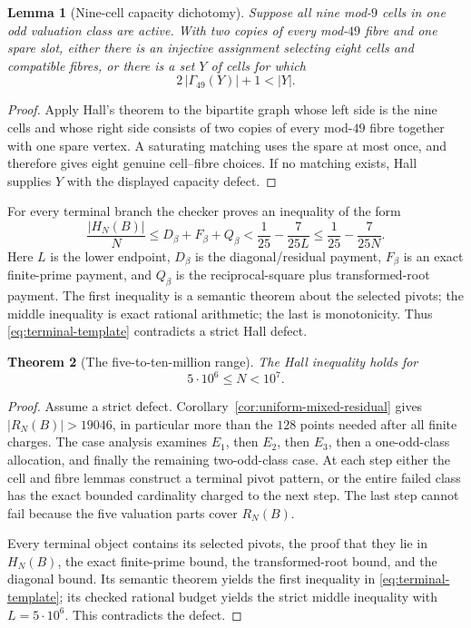 \documentclass[11pt]{article}
\newtheorem{theorem}{Theorem}[section]
\newtheorem{lemma}[theorem]{Lemma}
\theoremstyle{definition}
\newcommand{\RN}{R_N}
\newcommand{\FiveMillion}{5\cdot10^6}
\newcommand{\TenMillion}{10^7}
\begin{document}
\begin{lemma}[Nine-cell capacity dichotomy]\label{lem:nine-cell-capacity}
Suppose all nine mod-$9$ cells in one odd valuation class are active.
With two copies of every mod-$49$ fibre and one spare slot, either there is
an injective assignment selecting eight cells and compatible fibres, or
there is a set $Y$ of cells for which
\[
  2\,|\Gamma_{49}(Y)|+1<|Y|.
\]
\end{lemma}

\begin{proof}
Apply Hall's theorem to the bipartite graph whose left side is the nine cells
and whose right side consists of two copies of every mod-$49$ fibre together
with one spare vertex.  A saturating matching uses the spare at most once,
and therefore gives eight genuine cell--fibre choices.  If no matching
exists, Hall supplies $Y$ with the displayed capacity defect.
\end{proof}

For every terminal branch the checker proves an inequality of the form
\begin{equation}\label{eq:terminal-template}
 \frac{|H_N(B)|}{N}
 \leq D_\beta+F_\beta+Q_\beta
 <\frac1{25}-\frac7{25L}
 \leq\frac1{25}-\frac7{25N}.
\end{equation}
Here $L$ is the lower endpoint, $D_\beta$ is the diagonal/residual payment,
$F_\beta$ is an exact finite-prime payment, and $Q_\beta$ is the
reciprocal-square plus transformed-root payment.  The first inequality is a
semantic theorem about the selected pivots; the middle inequality is exact
rational arithmetic; the last is monotonicity.  Thus
\eqref{eq:terminal-template} contradicts a strict Hall defect.

\begin{theorem}[The five-to-ten-million range]
\label{prop:five-million-interval-close}
The Hall inequality holds for
\[
 \FiveMillion\leq N<\TenMillion.
\]
\end{theorem}

\begin{proof}
Assume a strict defect.  Corollary~\ref{cor:uniform-mixed-residual} gives
$|\RN(B)|>19046$, in particular more than the $128$ points needed after all
finite charges.  The case analysis examines $E_1$, then $E_2$, then $E_3$,
then a one-odd-class allocation, and finally the remaining two-odd-class
case.  At each step either the cell and fibre lemmas construct a terminal
pivot pattern, or the entire failed class has the exact bounded cardinality
charged to the next step.  The last step cannot fail because the five
valuation parts cover $\RN(B)$.

Every terminal object contains its selected pivots, the proof that they lie
in $H_N(B)$, the exact finite-prime bound, the transformed-root bound, and
the diagonal bound.  Its semantic theorem yields the first inequality in
\eqref{eq:terminal-template}; its checked rational budget yields the strict
middle inequality with $L=\FiveMillion$.  This contradicts the defect.
\end{proof}
\end{document}
